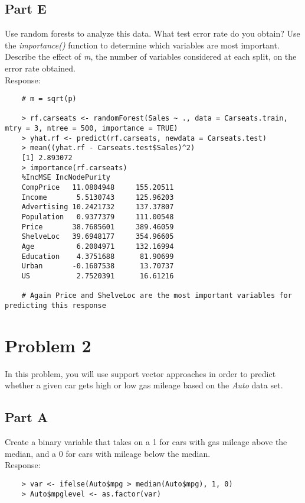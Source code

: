 \documentclass{article}
\begin{document}
	\subsection{Part E}
Use random forests to analyze this data. What test error rate do you obtain? Use the \textit{importance()} function to determine which variables are most important. Describe the effect of \textit{m}, the number of variables considered at each split, on the error rate obtained. \\
	
Response: 

\begin{verbatim}
	# m = sqrt(p)
	
	> rf.carseats <- randomForest(Sales ~ ., data = Carseats.train, mtry = 3, ntree = 500, importance = TRUE)
	> yhat.rf <- predict(rf.carseats, newdata = Carseats.test)
	> mean((yhat.rf - Carseats.test$Sales)^2)
	[1] 2.893072
	> importance(rf.carseats)
	%IncMSE IncNodePurity
	CompPrice   11.0804948     155.20511
	Income       5.5130743     125.96203
	Advertising 10.2421732     137.37807
	Population   0.9377379     111.00548
	Price       38.7685601     389.46059
	ShelveLoc   39.6948177     354.96605
	Age          6.2004971     132.16994
	Education    4.3751688      81.90699
	Urban       -0.1607538      13.70737
	US           2.7520391      16.61216
	
	# Again Price and ShelveLoc are the most important variables for predicting this response
\end{verbatim}

\section{Problem 2}
In this problem, you will use support vector approaches in order to predict whether a given car gets high or low gas mileage based on the \textit{Auto} data set.

	\subsection{Part A}
Create a binary variable that takes on a 1 for cars with gas mileage above the median, and a 0 for cars with mileage below the median. \\

Response: 

\begin{verbatim}
	> var <- ifelse(Auto$mpg > median(Auto$mpg), 1, 0)
	> Auto$mpglevel <- as.factor(var)
\end{verbatim}
\end{document}
